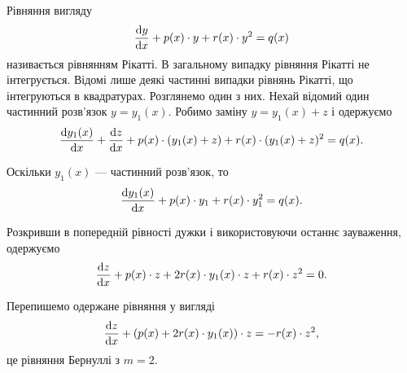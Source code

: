Рівняння вигляду 
\begin{equation*}
	\frac{\mathop{}\!\mathrm{d} y}{\mathop{}\!\mathrm{d} x} + p(x) \cdot y + r(x) \cdot y^2 = q(x)
\end{equation*} 
називається рівнянням Рікатті. В загальному випадку рівняння Рікатті не інтегрується. Відомі лише деякі частинні випадки рівнянь Рікатті, що інтегруються в квадратурах. Розглянемо один з них. Нехай відомий один частинний розв’язок $y = y_1(x)$. Робимо заміну $y = y_1(x) + z$ і одержуємо
\begin{equation*}
	\frac{\mathop{}\!\mathrm{d} y_1(x)}{\mathop{}\!\mathrm{d} x} + \frac{\mathop{}\!\mathrm{d} z}{\mathop{}\!\mathrm{d} x} + p(x) \cdot (y_1(x) + z) + r(x) \cdot (y_1(x) + z)^2 = q(x).
\end{equation*}

Оскільки $y_1(x)$ --- частинний розв’язок, то
\begin{equation*}
	\frac{\mathop{}\!\mathrm{d} y_1(x)}{\mathop{}\!\mathrm{d} x} + p(x) \cdot y_1 + r(x) \cdot y_1^2 = q(x).
\end{equation*}

Розкривши в попередній рівності дужки і використовуючи останнє зауваження, одержуємо
\begin{equation*}
	\frac{\mathop{}\!\mathrm{d} z}{\mathop{}\!\mathrm{d} x} + p(x) \cdot z + 2 r(x) \cdot y_1(x) \cdot z + r(x) \cdot z^2 = 0.
\end{equation*}

Перепишемо одержане рівняння у вигляді
\begin{equation*}
	\frac{\mathop{}\!\mathrm{d} z}{\mathop{}\!\mathrm{d} x} + \left(p(x) + 2 r(x) \cdot y_1(x)\right) \cdot z = - r(x) \cdot z^2 ,
\end{equation*}
це рівняння Бернуллі з $m = 2$.
